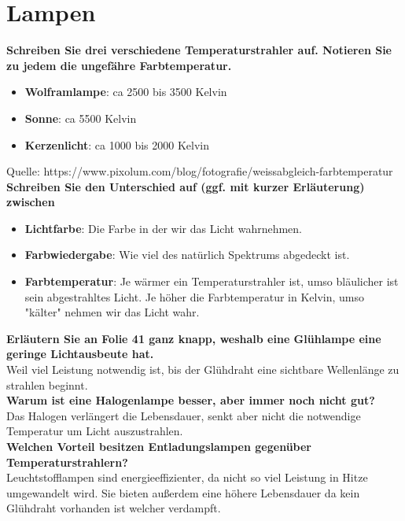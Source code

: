 \documentclass[a4paper]{article}
\begin{document}
	\newpage
	
	\section{Lampen}
	\textbf{Schreiben Sie drei verschiedene Temperaturstrahler auf. Notieren Sie zu jedem die ungefähre Farbtemperatur.}\\
	\begin{itemize}
		\item \textbf{Wolframlampe}: ca 2500 bis 3500 Kelvin\\
		\item \textbf{Sonne}: ca 5500 Kelvin\\
		\item \textbf{Kerzenlicht}: ca 1000 bis 2000 Kelvin\\
	\end{itemize}
	Quelle: https://www.pixolum.com/blog/fotografie/weissabgleich-farbtemperatur\\
	
	\textbf{Schreiben Sie den Unterschied auf (ggf. mit kurzer Erläuterung) zwischen}\\
	\begin{itemize}
		\item \textbf{Lichtfarbe}: Die Farbe in der wir das Licht wahrnehmen.\\
		\item \textbf{Farbwiedergabe}: Wie viel des natürlich Spektrums abgedeckt ist.\\
		\item \textbf{Farbtemperatur}: Je wärmer ein Temperaturstrahler ist, umso bläulicher ist sein abgestrahltes Licht. Je höher die Farbtemperatur in Kelvin, umso "kälter" nehmen wir das Licht wahr.\\
	\end{itemize}
	
	\textbf{Erläutern Sie an Folie 41 ganz knapp, weshalb eine Glühlampe eine geringe Lichtausbeute hat.}\\
	Weil viel Leistung notwendig ist, bis der Glühdraht eine sichtbare Wellenlänge zu strahlen beginnt.\\
	
	\textbf{Warum ist eine Halogenlampe besser, aber immer noch nicht gut?}\\
	Das Halogen verlängert die Lebensdauer, senkt aber nicht die notwendige Temperatur um Licht auszustrahlen.\\
	
	\textbf{Welchen Vorteil besitzen Entladungslampen gegenüber Temperaturstrahlern?}\\
	Leuchtstofflampen sind energieeffizienter, da nicht so viel Leistung in Hitze umgewandelt wird. Sie bieten außerdem eine höhere Lebensdauer da kein Glühdraht vorhanden ist welcher verdampft.\\
	
\end{document}
